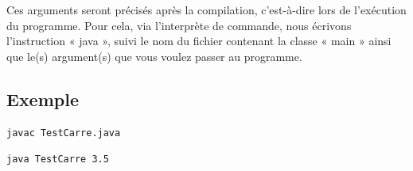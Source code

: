\documentclass[11pt,a4paper]{article}
\begin{document}
Ces arguments seront précisés après la compilation, c’est-à-dire lors de l’exécution du programme. Pour cela, via l’interprète de commande, nous écrivons l’instruction « java », suivi le nom du fichier contenant la classe « main » ainsi que le(s) argument(s) que vous voulez passer au programme.
\subsection*{Exemple}


\begin{lstlisting}[caption=Compilation]
javac TestCarre.java
\end{lstlisting}
\begin{lstlisting}[caption=Exécution (3.5 correspond à l’argument que l’on passe au programme)]
java TestCarre 3.5
\end{lstlisting}
\end{document}
